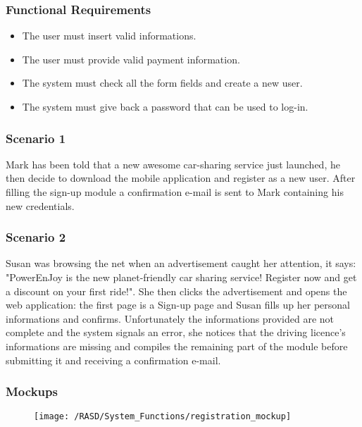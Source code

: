 \subsubsection{Functional Requirements}
\begin{itemize}
  \item The user must insert valid informations.
  \item The user must provide valid payment information.
  \item The system must check all the form fields and create a new user.
  \item The system must give back a password that can be used to log-in.
\end{itemize}


\subsubsection{Scenario 1}
Mark has been told that a new awesome car-sharing service just launched, he then decide to download the mobile application and register as a new user. After filling the sign-up module a confirmation e-mail is sent to Mark containing his new credentials.


\subsubsection{Scenario 2}
Susan was browsing the net when an advertisement caught her attention, it says: "PowerEnJoy is the new planet-friendly car sharing service! Register now and get a discount on your first ride!". She then clicks the advertisement and opens the web application: the first page is a Sign-up page and Susan fills up her personal informations and confirms. Unfortunately the informations provided are not complete and the system signals an error, she notices that the driving licence's informations are missing and compiles the remaining part of the module before submitting it and receiving a confirmation e-mail.


\subsubsection{Mockups}
\begin{figure}[!ht]
  \centering
  \vspace{0.2cm}
  \texttt{[image: /RASD/System\_Functions/registration\_mockup]}\\
  \vspace{0.4cm}
  \label{fig:registration_mockup} 
\end{figure}


